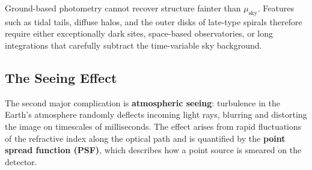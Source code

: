 \begin{warningblock}
Ground-based photometry cannot recover structure fainter than $\mu_\mathrm{sky}$. Features such as tidal tails, diffuse halos, and the outer disks of late-type spirals therefore require either exceptionally dark sites, space-based observatories, or long integrations that carefully subtract the time-variable sky background.
\end{warningblock}

\subsection{The Seeing Effect}

The second major complication is \textbf{atmospheric seeing}: turbulence in the Earth's atmosphere randomly deflects incoming light rays, blurring and distorting the image on timescales of milliseconds. The effect arises from rapid fluctuations of the refractive index along the optical path and is quantified by the \textbf{point spread function (PSF)}, which describes how a point source is smeared on the detector.

